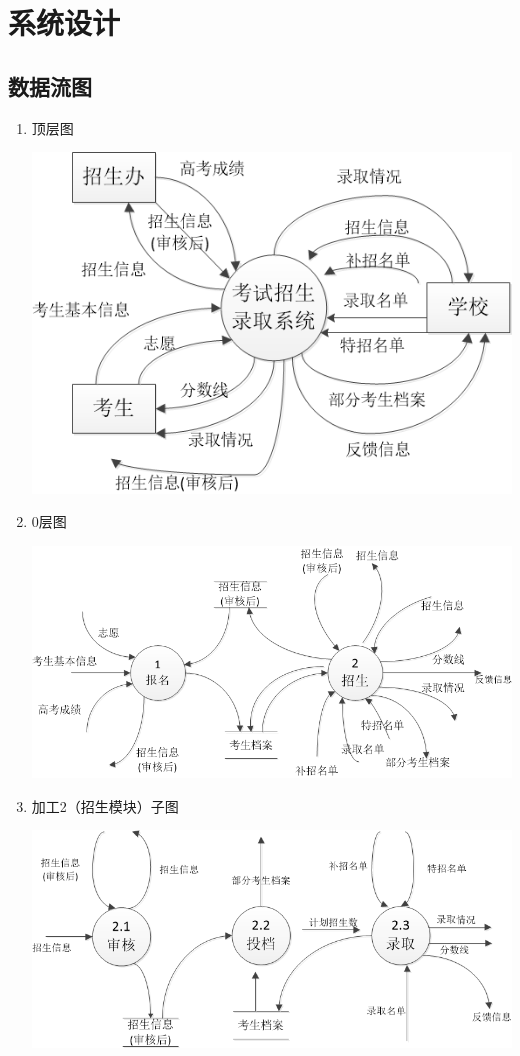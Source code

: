 \documentclass[CJK,utf8]{ctexrep}
\begin{document}
\section*{系统设计}

\subsection*{数据流图}

\begin{enumerate}
	\item 顶层图
	
	\includegraphics[scale=0.75]{DataFlowDiagram/顶层图.png}
	
	\item 0层图
	
	\includegraphics[scale=0.5]{DataFlowDiagram/0层图.png}
	
	\item 加工2（招生模块）子图
	
	\includegraphics[scale=0.55]{DataFlowDiagram/加工2子图.png}
	

\end{enumerate}
\end{document}
